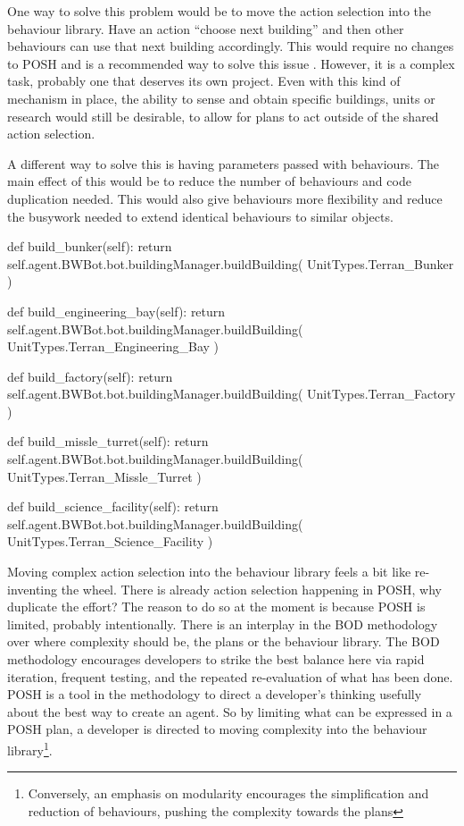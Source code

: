 \documentclass[11pt,openright,a4paper]{report}
\begin{document}
One way to solve this problem would be to move the action selection into the behaviour library. Have an action ``choose next building'' and then other behaviours can use that next building accordingly. This would require no changes to POSH and is a recommended way to solve this issue \cite{bryson2003behavior}. However, it is a complex task, probably one that deserves its own project. Even with this kind of mechanism in place, the ability to sense and obtain specific buildings, units or research would still be desirable, to allow for plans to act outside of the shared action selection.

A different way to solve this is having parameters passed with behaviours. The main effect of this would be to reduce the number of behaviours and code duplication needed. This would also give behaviours more flexibility and reduce the busywork needed to extend identical behaviours to similar objects.

\begin{Code}[frame=single,language=Python,tabsize=4,breaklines,breakatwhitespace,caption={A small selection of similar behaviours to build different buildings.},label=behaviours]
def build_bunker(self):
	return self.agent.BWBot.bot.buildingManager.buildBuilding( UnitTypes.Terran_Bunker )

def build_engineering_bay(self):
	return self.agent.BWBot.bot.buildingManager.buildBuilding( UnitTypes.Terran_Engineering_Bay )

def build_factory(self):
	return self.agent.BWBot.bot.buildingManager.buildBuilding( UnitTypes.Terran_Factory )

def build_missle_turret(self):
	return self.agent.BWBot.bot.buildingManager.buildBuilding( UnitTypes.Terran_Missle_Turret )

def build_science_facility(self):
	return self.agent.BWBot.bot.buildingManager.buildBuilding( UnitTypes.Terran_Science_Facility )
\end{Code}


Moving complex action selection into the behaviour library feels a bit like re-inventing the wheel. There is already action selection happening in POSH, why duplicate the effort? The reason to do so at the moment is because POSH is limited, probably intentionally. There is an interplay in the BOD methodology over where complexity should be, the plans or the behaviour library. The BOD methodology encourages developers to strike the best balance here via rapid iteration, frequent testing, and the repeated re-evaluation of what has been done. POSH is a tool in the methodology to direct a developer's thinking usefully about the best way to create an agent. So by limiting what can be expressed in a POSH plan, a developer is directed to moving complexity into the behaviour library\footnote{Conversely, an emphasis on modularity encourages the simplification and reduction of behaviours, pushing the complexity towards the plans}.
\end{document}
